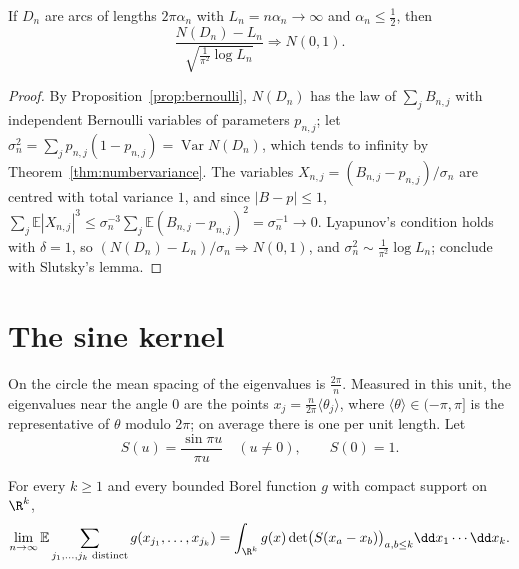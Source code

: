 \begin{corollary}\label{cor:countclt}
If $D_n$ are arcs of lengths $2\pi\alpha_n$ with $L_n=n\alpha_n\to\infty$ and $\alpha_n\le\frac12$, then
\[
\frac{N(D_n)-L_n}{\sqrt{\frac1{\pi^2}\log L_n}}\Longrightarrow N(0,1).
\]
\end{corollary}

\begin{proof}
By Proposition~\ref{prop:bernoulli}, $N(D_n)$ has the law of $\sum_jB_{n,j}$ with independent Bernoulli variables of parameters $p_{n,j}$; let $\sigma_n^2=\sum_jp_{n,j}(1-p_{n,j})=\operatorname{Var}N(D_n)$, which tends to infinity
by Theorem~\ref{thm:numbervariance}. The variables $X_{n,j}=(B_{n,j}-p_{n,j})/\sigma_n$ are centred with total variance $1$, and since $|B-p|\le1$,
$\sum_j\mathbb E|X_{n,j}|^3\le\sigma_n^{-3}\sum_j\mathbb E(B_{n,j}-p_{n,j})^2=\sigma_n^{-1}\to0$. Lyapunov's condition holds with $\delta=1$, so $(N(D_n)-L_n)/\sigma_n\Rightarrow N(0,1)$, and $\sigma_n^2\sim\frac1{\pi^2}\log L_n$; conclude with Slutsky's lemma.
\end{proof}

\section{The sine kernel}

On the circle the mean spacing of the eigenvalues is $\frac{2\pi}n$. Measured in this unit, the eigenvalues near the angle $0$ are the points $x_j=\frac n{2\pi}\langle\theta_j\rangle$, where $\langle\theta\rangle\in(-\pi,\pi]$ is the
representative of $\theta$ modulo $2\pi$; on average there is one per unit length. Let
\[
S(u)=\frac{\sin\pi u}{\pi u}\quad(u\ne0),\qquad S(0)=1.
\]

\begin{theorem}\label{thm:sinekernel}
For every $k\ge1$ and every bounded Borel function $g$ with compact support on $\R^k$,
\[
\lim_{n\to\infty}\mathbb E\sum_{j_1,\dots,j_k\text{ distinct}}g(x_{j_1},\dots,x_{j_k})=\int_{\R^k}g(x)\det\bigl(S(x_a-x_b)\bigr)_{a,b\le k}\dd x_1\cdots\dd x_k.
\]
\end{theorem}

